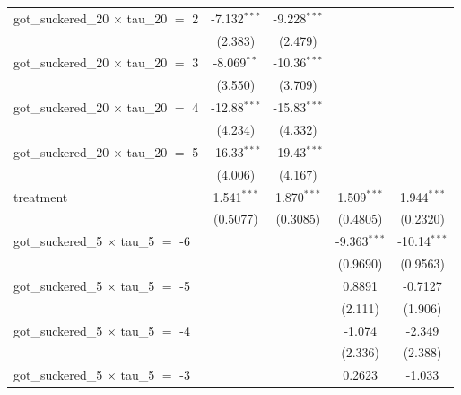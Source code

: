 \begin{tabular}{lcccc}
   got\_suckered\_20 $\times$ tau\_20 $=$ 2      & -7.132$^{***}$ & -9.228$^{***}$  &                &   \\   
                                                 & (2.383)        & (2.479)         &                &   \\   
   got\_suckered\_20 $\times$ tau\_20 $=$ 3      & -8.069$^{**}$  & -10.36$^{***}$  &                &   \\   
                                                 & (3.550)        & (3.709)         &                &   \\   
   got\_suckered\_20 $\times$ tau\_20 $=$ 4      & -12.88$^{***}$ & -15.83$^{***}$  &                &   \\   
                                                 & (4.234)        & (4.332)         &                &   \\   
   got\_suckered\_20 $\times$ tau\_20 $=$ 5      & -16.33$^{***}$ & -19.43$^{***}$  &                &   \\   
                                                 & (4.006)        & (4.167)         &                &   \\   
   treatment                                     & 1.541$^{***}$  & 1.870$^{***}$   & 1.509$^{***}$  & 1.944$^{***}$\\   
                                                 & (0.5077)       & (0.3085)        & (0.4805)       & (0.2320)\\   
   got\_suckered\_5 $\times$ tau\_5 $=$ -6       &                &                 & -9.363$^{***}$ & -10.14$^{***}$\\   
                                                 &                &                 & (0.9690)       & (0.9563)\\   
   got\_suckered\_5 $\times$ tau\_5 $=$ -5       &                &                 & 0.8891         & -0.7127\\   
                                                 &                &                 & (2.111)        & (1.906)\\   
   got\_suckered\_5 $\times$ tau\_5 $=$ -4       &                &                 & -1.074         & -2.349\\   
                                                 &                &                 & (2.336)        & (2.388)\\   
   got\_suckered\_5 $\times$ tau\_5 $=$ -3       &                &                 & 0.2623         & -1.033\\   

\end{tabular}
